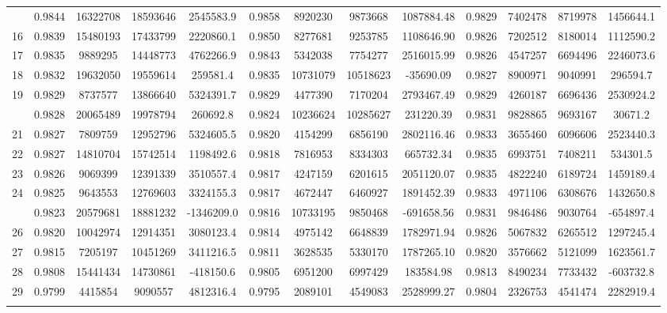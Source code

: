 \documentclass[
  12pt,
]{article}
\begin{document}
\begin{longtable}[t]{lcccccccccccc}
\addlinespace
15 & 0.9844 & 16322708 & 18593646 & 2545583.9 & 0.9858 & 8920230 & 9873668 & 1087884.48 & 0.9829 & 7402478 & 8719978 & 1456644.1\\
16 & 0.9839 & 15480193 & 17433799 & 2220860.1 & 0.9850 & 8277681 & 9253785 & 1108646.90 & 0.9826 & 7202512 & 8180014 & 1112590.2\\
17 & 0.9835 & 9889295 & 14448773 & 4762266.9 & 0.9843 & 5342038 & 7754277 & 2516015.99 & 0.9826 & 4547257 & 6694496 & 2246073.6\\
18 & 0.9832 & 19632050 & 19559614 & 259581.4 & 0.9835 & 10731079 & 10518623 & -35690.09 & 0.9827 & 8900971 & 9040991 & 296594.7\\
19 & 0.9829 & 8737577 & 13866640 & 5324391.7 & 0.9829 & 4477390 & 7170204 & 2793467.49 & 0.9829 & 4260187 & 6696436 & 2530924.2\\
\addlinespace
20 & 0.9828 & 20065489 & 19978794 & 260692.8 & 0.9824 & 10236624 & 10285627 & 231220.39 & 0.9831 & 9828865 & 9693167 & 30671.2\\
21 & 0.9827 & 7809759 & 12952796 & 5324605.5 & 0.9820 & 4154299 & 6856190 & 2802116.46 & 0.9833 & 3655460 & 6096606 & 2523440.3\\
22 & 0.9827 & 14810704 & 15742514 & 1198492.6 & 0.9818 & 7816953 & 8334303 & 665732.34 & 0.9835 & 6993751 & 7408211 & 534301.5\\
23 & 0.9826 & 9069399 & 12391339 & 3510557.4 & 0.9817 & 4247159 & 6201615 & 2051120.07 & 0.9835 & 4822240 & 6189724 & 1459189.4\\
24 & 0.9825 & 9643553 & 12769603 & 3324155.3 & 0.9817 & 4672447 & 6460927 & 1891452.39 & 0.9833 & 4971106 & 6308676 & 1432650.8\\
\addlinespace
25 & 0.9823 & 20579681 & 18881232 & -1346209.0 & 0.9816 & 10733195 & 9850468 & -691658.56 & 0.9831 & 9846486 & 9030764 & -654897.4\\
26 & 0.9820 & 10042974 & 12914351 & 3080123.4 & 0.9814 & 4975142 & 6648839 & 1782971.94 & 0.9826 & 5067832 & 6265512 & 1297245.4\\
27 & 0.9815 & 7205197 & 10451269 & 3411216.5 & 0.9811 & 3628535 & 5330170 & 1787265.10 & 0.9820 & 3576662 & 5121099 & 1623561.7\\
28 & 0.9808 & 15441434 & 14730861 & -418150.6 & 0.9805 & 6951200 & 6997429 & 183584.98 & 0.9813 & 8490234 & 7733432 & -603732.8\\
29 & 0.9799 & 4415854 & 9090557 & 4812316.4 & 0.9795 & 2089101 & 4549083 & 2528999.27 & 0.9804 & 2326753 & 4541474 & 2282919.4\\
\addlinespace

\end{longtable}
\end{document}
